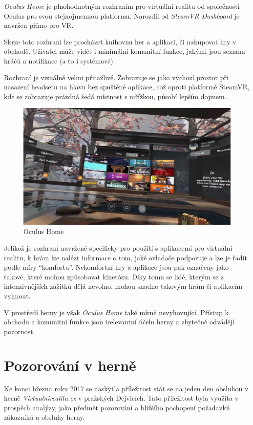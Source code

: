 \emph{Oculus Home} je plnohodnotným rozhraním pro virtuální realitu od
společnosti Oculus pro svou stejnojmennou platformu. Narozdíl od
\emph{SteamVR Dashboard} je navržen přímo pro VR.

Skrze toto rozhraní lze procházet knihovnu her a aplikací, či nakupovat hry v
obchodě. Uživatel může vidět i minimální komunitní funkce, jakými jsou
seznam hráčů a notifikace (a to i systémové).

Rozhraní je vizuálně velmi přitažlivé. Zobrazuje se jako výchozí prostor
při nasazení headsetu na hlavu bez spuštěné aplikace, což oproti platformě
SteamVR, kde se zobrazuje prázdná šedá místnost s mřížkou, působí lepším
dojmem.

\begin{figure}
\centering
\includegraphics[width=12cm]{src/assets/oculus-home.jpg}
\caption{Oculus Home}
\end{figure}

Jelikož je rozhraní navržené specificky pro použití s aplikacemi pro
virtuální realitu, k hrám lze nalézt informace o tom, jaké ovladače
podporuje a lze je řadit podle míry ``komfortu''. Nekomfortní hry a aplikace jsou
pak označeny jako takové, které mohou způsobovat kinetózu. Díky tomu se
lidé, kterým se z intenzivnějších zážitků dělá nevolno, mohou snadno takovým
hrám či aplikacím vyhnout.

V prostředí herny je však \emph{Oculus Home} také mírně nevyhovující.
Přístup k obchodu a komunitní funkce jsou irelevantní účelu herny a
zbytečně odvádějí pozornost.

\section{Pozorování v herně}\label{pozorovuxe1nuxed-v-hernux11b}

Ke konci března roku 2017 se naskytla příležitost stát se na jeden den
obsluhou v herně \emph{Virtualnirealita.cz} v pražských Dejvicích. Tato
příležitost byla využita v prospěch analýzy, jako předmět pozorování a
bližšího pochopení požadavků zákazníků a obsluhy herny.

